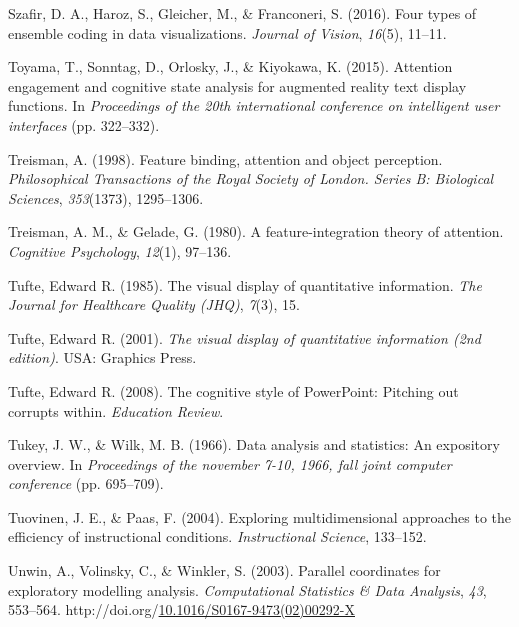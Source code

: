 \documentclass[print]{nuthesis}
\newlength{\cslhangindent}
\newenvironment{CSLReferences}[2]%
{\setlength{\parindent}{0pt}%
\everypar{\setlength{\hangindent}{\cslhangindent}}\ignorespaces}%
{\par}
\begin{document}
\begin{CSLReferences}{1}{0}
\leavevmode{}%
Szafir, D. A., Haroz, S., Gleicher, M., \& Franconeri, S. (2016). Four types of ensemble coding in data visualizations. \emph{Journal of Vision}, \emph{16}(5), 11--11.

\leavevmode{}%
Toyama, T., Sonntag, D., Orlosky, J., \& Kiyokawa, K. (2015). Attention engagement and cognitive state analysis for augmented reality text display functions. In \emph{Proceedings of the 20th international conference on intelligent user interfaces} (pp. 322--332).

\leavevmode{}%
Treisman, A. (1998). Feature binding, attention and object perception. \emph{Philosophical Transactions of the Royal Society of London. Series B: Biological Sciences}, \emph{353}(1373), 1295--1306.

\leavevmode{}%
Treisman, A. M., \& Gelade, G. (1980). A feature-integration theory of attention. \emph{Cognitive Psychology}, \emph{12}(1), 97--136.

\leavevmode{}%
Tufte, Edward R. (1985). The visual display of quantitative information. \emph{The Journal for Healthcare Quality (JHQ)}, \emph{7}(3), 15.

\leavevmode{}%
Tufte, Edward R. (2001). \emph{The visual display of quantitative information (2nd edition)}. USA: Graphics Press.

\leavevmode{}%
Tufte, Edward R. (2008). The cognitive style of PowerPoint: Pitching out corrupts within. \emph{Education Review}.

\leavevmode{}%
Tukey, J. W., \& Wilk, M. B. (1966). Data analysis and statistics: An expository overview. In \emph{Proceedings of the november 7-10, 1966, fall joint computer conference} (pp. 695--709).

\leavevmode{}%
Tuovinen, J. E., \& Paas, F. (2004). Exploring multidimensional approaches to the efficiency of instructional conditions. \emph{Instructional Science}, 133--152.

\leavevmode{}%
Unwin, A., Volinsky, C., \& Winkler, S. (2003). Parallel coordinates for exploratory modelling analysis. \emph{Computational Statistics \& Data Analysis}, \emph{43}, 553--564. http://doi.org/\href{https://doi.org/10.1016/S0167-9473(02)00292-X}{10.1016/S0167-9473(02)00292-X}


\end{CSLReferences}
\end{document}
